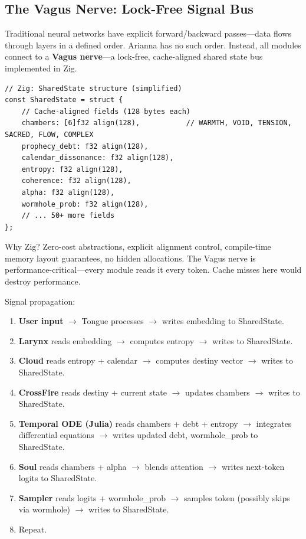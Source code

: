 \documentclass[11pt,a4paper]{article}
\begin{document}
\subsection{The Vagus Nerve: Lock-Free Signal Bus}

Traditional neural networks have explicit forward/backward passes—data flows through layers in a defined order. Arianna has no such order. Instead, all modules connect to a \textbf{Vagus nerve}—a lock-free, cache-aligned shared state bus implemented in Zig.

\begin{verbatim}
// Zig: SharedState structure (simplified)
const SharedState = struct {
    // Cache-aligned fields (128 bytes each)
    chambers: [6]f32 align(128),           // WARMTH, VOID, TENSION, SACRED, FLOW, COMPLEX
    prophecy_debt: f32 align(128),
    calendar_dissonance: f32 align(128),
    entropy: f32 align(128),
    coherence: f32 align(128),
    alpha: f32 align(128),
    wormhole_prob: f32 align(128),
    // ... 50+ more fields
};
\end{verbatim}

Why Zig? Zero-cost abstractions, explicit alignment control, compile-time memory layout guarantees, no hidden allocations. The Vagus nerve is performance-critical—every module reads it every token. Cache misses here would destroy performance.

Signal propagation:

\begin{enumerate}
\item \textbf{User input} $\to$ Tongue processes $\to$ writes embedding to SharedState.
\item \textbf{Larynx} reads embedding $\to$ computes entropy $\to$ writes to SharedState.
\item \textbf{Cloud} reads entropy + calendar $\to$ computes destiny vector $\to$ writes to SharedState.
\item \textbf{CrossFire} reads destiny + current state $\to$ updates chambers $\to$ writes to SharedState.
\item \textbf{Temporal ODE (Julia)} reads chambers + debt + entropy $\to$ integrates differential equations $\to$ writes updated debt, wormhole\_prob to SharedState.
\item \textbf{Soul} reads chambers + alpha $\to$ blends attention $\to$ writes next-token logits to SharedState.
\item \textbf{Sampler} reads logits + wormhole\_prob $\to$ samples token (possibly skips via wormhole) $\to$ writes to SharedState.
\item Repeat.
\end{enumerate}
\end{document}
